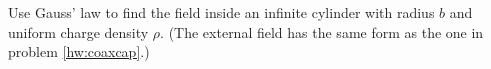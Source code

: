         Use Gauss' law to find the field inside an
        infinite cylinder with radius $b$ and uniform
        charge density $\rho$. (The external field has the same form as
        the one in problem \ref{hw:coaxcap}.)\answercheck
